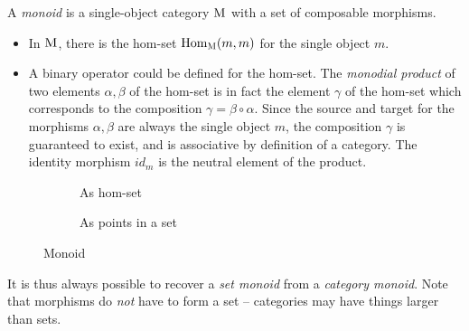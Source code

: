 \begin{definition}
    A \textit{monoid} is a single-object category ${\normalfont\textsc{M}}$ with a set of composable morphisms.
    
    \begin{itemize}
        \item In ${\normalfont\textsc{M}}$, there is the hom-set $\mathrm{Hom}_{{\normalfont\textsc{M}}}(m, m)$ for the single object $m$.
        \item A binary operator could be defined for the hom-set. The \textit{monodial product} of two elements $\alpha, \beta$ of the hom-set is in fact the element $\gamma$ of the hom-set which corresponds to the composition $\gamma = \beta \circ \alpha$. Since the source and target for the morphisms $\alpha, \beta$ are always the single object $m$, the composition $\gamma$ is guaranteed to exist, and is associative by definition of a category. The identity morphism $id_m$ is the neutral element of the product.
    \end{itemize}
    
    \begin{figure}[H]
        \centering
        \begin{subfigure}{0.45\textwidth}
            \centering
            \caption{As hom-set}
        \end{subfigure}
        \begin{subfigure}{0.45\textwidth}
            \centering
            \caption{As points in a set}
        \end{subfigure}
        \caption{Monoid}
        \label{fig:monoid-hom-set}
    \end{figure}
\end{definition}

\begin{remark}
    It is thus always possible to recover a \textit{set monoid} from a \textit{category monoid}. Note that morphisms do \textit{not} have to form a set -- categories may have things larger than sets.
\end{remark}

